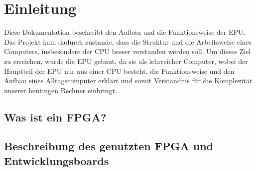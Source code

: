 \chapter{Einleitung}
\label{c:einleitung}
Diese Dokumentation beschreibt den Aufbau und die Funktionsweise der \ac{EPU}. Das Projekt kam
dadurch zustande, dass die Struktur und die Arbeitsweise eines Computers, insbesondere der
\ac{CPU} besser verstanden werden soll. Um dieses Ziel zu erreichen, wurde die \ac{EPU} gebaut, da
sie als lehrreicher Computer, wobei der Hauptteil der \ac{EPU} nur aus einer \ac{CPU} besteht, die
Funktionsweise und den Aufbau eines Alltagscomputer erklärt und somit Verständnis für die
Komplexität unserer heutingen Rechner einbringt.
\section{Was ist ein FPGA?}
\section{Beschreibung des genutzten FPGA und Entwicklungsboards}
